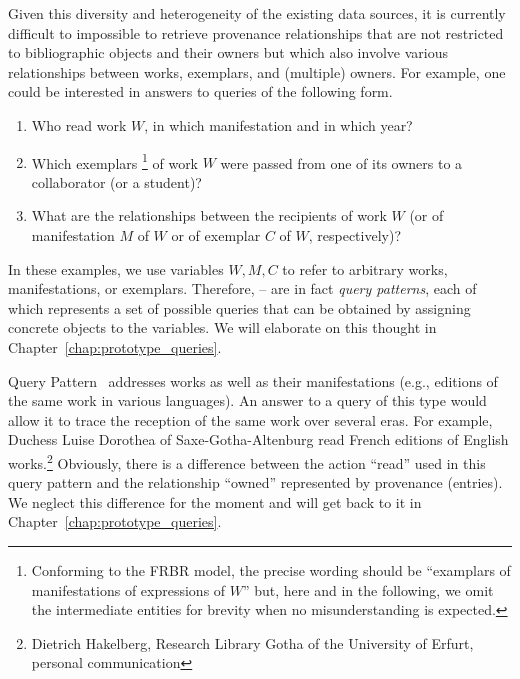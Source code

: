 Given this diversity and heterogeneity of the existing data sources,
it is currently difficult to impossible to retrieve provenance relationships
that are not restricted to bibliographic objects and their owners
but which also involve various relationships between works, exemplars, and (multiple) owners.
For example, one could be interested in answers to queries of the following form.
%
\begin{enumerate}
  \item[\exaquery{1}]
    Who read %
    work $W$, in which manifestation and in which year?
  \item[\exaquery{2}]
    Which exemplars%
    \footnote{%
      Conforming to the FRBR model,
      the precise wording should be \enquote{examplars of manifestations of expressions of $W$}
      but, here and in the following,
      we omit the intermediate entities for brevity when no misunderstanding is expected.%
    }
    of work $W$
    were passed from one of its owners to a collaborator (or a student)?
  \item[\exaquery{3}]
    What are the relationships between the recipients of work $W$
    (or of manifestation $M$ of $W$ or of exemplar $C$ of $W$, respectively)?
\end{enumerate}
%
In these examples, we use variables $W,M,C$ to refer to arbitrary works,
manifestations, or exemplars. Therefore, -- are in fact
\emph{query patterns}, each of which represents a set of possible queries
that can be obtained by assigning concrete objects to the variables.
We will elaborate on this thought in Chapter~\ref{chap:prototype_queries}.

Query Pattern~ addresses works as well as their manifestations
(e.g., editions of the same work in various languages).
An answer to a query of this type would allow it to trace the reception
of the same work over several eras. For example, Duchess Luise Dorothea of Saxe-Gotha-Altenburg
read French editions of English works.\footnote{Dietrich Hakelberg, Research Library Gotha of the University of Erfurt, personal communication}
Obviously, there is a difference between the action \enquote{read}
used in this query pattern and the relationship \enquote{owned} represented by
provenance (entries). We neglect this difference for the moment
and will get back to it in Chapter~\ref{chap:prototype_queries}.

